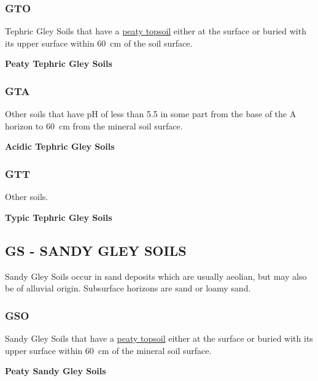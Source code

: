 \documentclass[
  letterpaper,
  DIV=11,
  numbers=noendperiod]{scrreprt}
\begin{document}
\hypertarget{sec-key-GTO}{%
\subsubsection{\texorpdfstring{\textbf{GTO}}{GTO}}\label{sec-key-GTO}}

Tephric Gley Soils that have a \protect\hyperlink{diag-pts}{peaty
topsoil} either at the surface or buried with its upper surface within
60~cm of the soil surface.

\textbf{Peaty Tephric Gley Soils}

\hypertarget{sec-key-GTA}{%
\subsubsection{\texorpdfstring{\textbf{GTA}}{GTA}}\label{sec-key-GTA}}

Other soils that have pH of less than 5.5 in some part from the base of
the A horizon to 60~cm from the mineral soil surface.

\textbf{Acidic Tephric Gley Soils}

\hypertarget{sec-key-GTT}{%
\subsubsection{\texorpdfstring{\textbf{GTT}}{GTT}}\label{sec-key-GTT}}

Other soils.

\textbf{Typic Tephric Gley Soils}

\hypertarget{sec-GS}{%
\subsection{\texorpdfstring{\textbf{GS} - SANDY GLEY
SOILS}{GS - SANDY GLEY SOILS}}\label{sec-GS}}

Sandy Gley Soils occur in sand deposits which are usually aeolian, but
may also be of alluvial origin. Subsurface horizons are sand or loamy
sand.

\hypertarget{sec-key-GSO}{%
\subsubsection{\texorpdfstring{\textbf{GSO}}{GSO}}\label{sec-key-GSO}}

Sandy Gley Soils that have a \protect\hyperlink{sec-diag-pts}{peaty
topsoil} either at the surface or buried with its upper surface within
60~cm of the mineral soil surface.

\textbf{Peaty Sandy Gley Soils}
\end{document}
